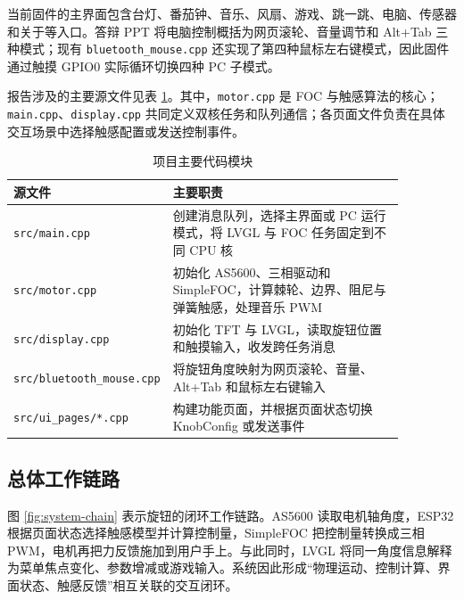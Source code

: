 \documentclass[12pt,a4paper,UTF8]{ctexart}
\begin{document}
当前固件的主界面包含台灯、番茄钟、音乐、风扇、游戏、跳一跳、电脑、传感器和关于等入口。答辩 PPT 将电脑控制概括为网页滚轮、音量调节和 Alt+Tab 三种模式；现有 \texttt{bluetooth\_mouse.cpp} 还实现了第四种鼠标左右键模式，因此固件通过触摸 GPIO0 实际循环切换四种 PC 子模式。

报告涉及的主要源文件见表 \ref{tab:source-map}。其中，\texttt{motor.cpp} 是 FOC 与触感算法的核心；\texttt{main.cpp}、\texttt{display.cpp} 共同定义双核任务和队列通信；各页面文件负责在具体交互场景中选择触感配置或发送控制事件。

\begin{table}[H]
\centering
\small
\begin{tabular}{p{0.27\linewidth}p{0.60\linewidth}}
\toprule
源文件 & 主要职责 \\
\midrule
\texttt{src/main.cpp} & 创建消息队列，选择主界面或 PC 运行模式，将 LVGL 与 FOC 任务固定到不同 CPU 核 \\
\texttt{src/motor.cpp} & 初始化 AS5600、三相驱动和 SimpleFOC，计算棘轮、边界、阻尼与弹簧触感，处理音乐 PWM \\
\texttt{src/display.cpp} & 初始化 TFT 与 LVGL，读取旋钮位置和触摸输入，收发跨任务消息 \\
\texttt{src/bluetooth\_mouse.cpp} & 将旋钮角度映射为网页滚轮、音量、Alt+Tab 和鼠标左右键输入 \\
\texttt{src/ui\_pages/*.cpp} & 构建功能页面，并根据页面状态切换 KnobConfig 或发送事件 \\
\bottomrule
\end{tabular}
\caption{项目主要代码模块}
\label{tab:source-map}
\end{table}

\subsection{总体工作链路}

图 \ref{fig:system-chain} 表示旋钮的闭环工作链路。AS5600 读取电机轴角度，ESP32 根据页面状态选择触感模型并计算控制量，SimpleFOC 把控制量转换成三相 PWM，电机再把力反馈施加到用户手上。与此同时，LVGL 将同一角度信息解释为菜单焦点变化、参数增减或游戏输入。系统因此形成“物理运动、控制计算、界面状态、触感反馈”相互关联的交互闭环。
\end{document}
